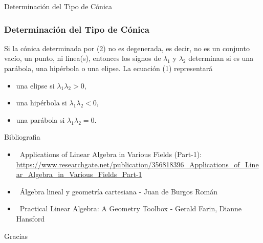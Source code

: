 \documentclass[xcolor={dvipsnames},aspectratio=169,10pt]{beamer}
\begin{document}
\begin{frame}{Determinación del Tipo de Cónica}
  \frametitle{Determinación del Tipo de Cónica}
  Si la cónica determinada por (2) no es degenerada, es decir, no es un conjunto vacío, un punto, ni línea(s), entonces los signos de $\lambda_1$ y $\lambda_2$ determinan si es una parábola, una hipérbola o una elipse. La ecuación (1) representará
  \begin{itemize}
    \item una elipse si $\lambda_1\lambda_2 > 0$,
    \item una hipérbola si $\lambda_1\lambda_2 < 0$,
    \item una parábola si $\lambda_1\lambda_2 = 0$.
  \end{itemize}
\end{frame}

\begin{frame}{Bibliografia}
  \begin{itemize}
    \item \faGlobe\, Applications of Linear Algebra in Various Fields (Part-1): \url{https://www.researchgate.net/publication/356818396_Applications_of_Linear_Algebra_in_Various_Fields_Part-1}
    \item \faBook\, Álgebra lineal y geometría cartesiana - Juan de Burgos Román
    \item \faBook\, Practical Linear Algebra: A Geometry Toolbox - Gerald Farin, Dianne Hansford
  \end{itemize}
\end{frame}

\begin{frame}[standout]
  Gracias \\
\end{frame}
\end{document}
